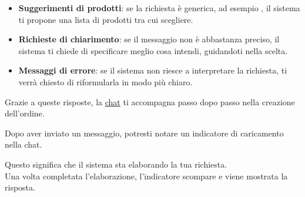 \begin{itemize}[itemsep=5pt, parsep=5pt, label=$\scriptstyle\bullet$]
	\item \textbf{Suggerimenti di prodotti}: se la richiesta \`e generica, ad esempio , il sistema ti propone una lista di prodotti tra cui scegliere.
\end{itemize}

\begin{itemize}[itemsep=5pt, parsep=5pt, label=$\scriptstyle\bullet$]
	\item \textbf{Richieste di chiarimento}: se il messaggio non \`e abbastanza preciso, il sistema ti chiede di specificare meglio cosa intendi, guidandoti nella scelta.
\end{itemize}

\begin{itemize}[itemsep=5pt, parsep=5pt, label=$\scriptstyle\bullet$]
	\item \textbf{Messaggi di errore}: se il sistema non riesce a interpretare la richiesta, ti verr\`a chiesto di riformularla in modo pi\`u chiaro.
\end{itemize}

Grazie a queste risposte, la \hyperlink{glossario:chat}{chat} ti accompagna passo dopo passo nella creazione dell'ordine.


Dopo aver inviato un messaggio, potresti notare un indicatore di caricamento nella chat.

Questo significa che il sistema sta elaborando la tua richiesta.\\
Una volta completata l'elaborazione, l'indicatore scompare e viene mostrata la risposta.
